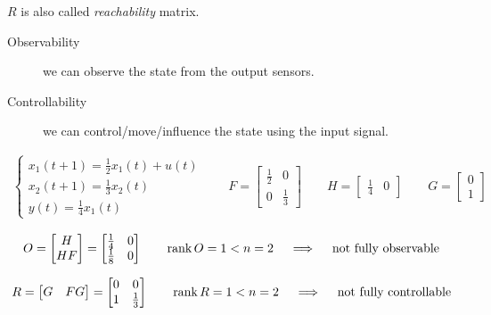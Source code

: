 $R$ is also called \emph{reachability} matrix.

\begin{remark}
    \begin{description}
        \item[Observability] we can observe the state from the output sensors.
        \item[Controllability] we can control/move/influence the state using the input signal.
    \end{description}
\end{remark}

\begin{example}
    \begin{align*}
        \begin{cases}
            x_1(t+1) = \frac{1}{2} x_1(t) + u(t) \\
            x_2(t+1) = \frac{1}{3}x_2(t) \\
            y(t) = \frac{1}{4}x_1(t)
        \end{cases}
        \qquad
        F = \begin{bmatrix}
            \frac{1}{2} & 0 \\
            0 & \frac{1}{3}
        \end{bmatrix}
        \qquad
        H = \begin{bmatrix}
            \frac{1}{4} & 0
        \end{bmatrix}
        \qquad
        G = \begin{bmatrix}
            0 \\
            1
        \end{bmatrix}
    \end{align*}

    \[
        O = \begin{bmatrix}
            H \\
            HF
        \end{bmatrix} = \begin{bmatrix}
            \frac{1}{4} & 0 \\
            \frac{1}{8} & 0
        \end{bmatrix}
        \qquad
        \operatorname{rank} O = 1 < n = 2
        \quad\implies\quad \text{not fully observable}
    \]

    \[
        R = \begin{bmatrix}
            G & FG
        \end{bmatrix} = \begin{bmatrix}
            0 & 0 \\
            1 & \frac{1}{3}
        \end{bmatrix}
        \qquad
        \operatorname{rank} R = 1 < n = 2
        \quad\implies\quad \text{not fully controllable}
    \]
\end{example}

